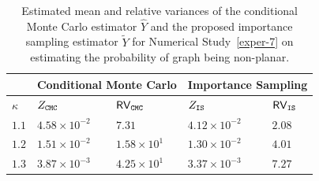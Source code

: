 \documentclass[pdflatex, sn-mathphys-ay]{sn-jnl}%
\newcommand{\wt}{\widetilde}
\newcommand{\wh}{\widehat}
\theoremstyle{thmstyleone}%
\theoremstyle{thmstyletwo}%
\theoremstyle{thmstylethree}%
\begin{document}
\begin{table}[h]
 
\caption{Estimated mean and relative variances of the conditional Monte Carlo estimator $\wh Y$ and the proposed importance sampling estimator $\wt Y$ for Numerical Study~\ref{exper-7} on estimating the probability of graph being non-planar.}
\label{tab:relVar_exper_7}
\centering
\begin{tabular}{@{}lllll@{}}
    \hline
      & \multicolumn{2}{l}{Conditional Monte Carlo}
            & \multicolumn{2}{l}{Importance Sampling} \\
    \hline
     $\kappa$  &  $Z_{\tt CMC}$  &  ${\sf RV}_{\tt CMC}$   &   $Z_{\tt IS}$  &  ${\sf RV}_{\tt IS}$ \\
    \hline
$1.1$  &  $4.58 \times 10^{-2}$  &  $7.31$  &  $4.12 \times 10^{-2}$  &  $2.08$  \\
    \hline
$1.2$  &  $1.51 \times 10^{-2}$  &  $1.58 \times 10^{1}$  &  $1.30 \times 10^{-2}$  &  $4.01$  \\
    \hline
$1.3$  &  $3.87 \times 10^{-3}$  &  $4.25 \times 10^{1}$  &  $3.37 \times 10^{-3}$  &  $7.27$  \\
    \hline
\end{tabular}
\end{table}
\end{document}
